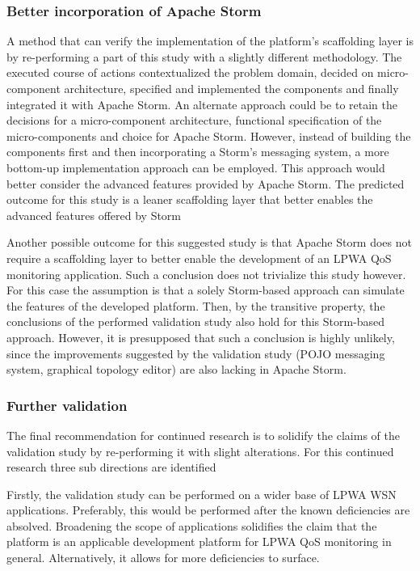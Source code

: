 \subsubsection{Better incorporation of Apache Storm}
A method that can verify the implementation of the  platform's scaffolding layer is by re-performing a part of this study with a slightly different methodology. The executed course of actions contextualized the problem domain, decided on micro-component architecture, specified and implemented the components and finally integrated it with Apache Storm. An alternate approach could be to retain the decisions for a micro-component architecture, functional specification of the micro-components and choice for Apache Storm. However, instead of building the components first and then incorporating a Storm's messaging system, a more bottom-up implementation approach can be employed. This approach would better consider the advanced features provided by Apache Storm. The predicted outcome for this study is a leaner scaffolding layer that better enables the advanced features offered by Storm

Another possible outcome for this suggested study is that Apache Storm does not require a scaffolding layer to better enable the development of an LPWA QoS monitoring application. Such a conclusion does not trivialize this study however. For this case the assumption is that a solely Storm-based approach can simulate the features of the developed platform. Then, by the transitive property, the conclusions of the performed validation study also hold for this Storm-based approach. However, it is presupposed that such a conclusion is highly unlikely, since the improvements suggested by the validation study (POJO messaging system, graphical topology editor) are also lacking in Apache Storm.

\subsubsection{Further validation}
The final recommendation for continued research is to solidify the claims of the validation study by re-performing it with slight alterations. For this continued research three sub directions are identified

Firstly, the validation study can be performed on a wider base of LPWA WSN applications. Preferably, this would be performed after the known deficiencies are absolved. Broadening the scope of applications solidifies the claim that the platform is an applicable development platform for LPWA QoS monitoring in general. Alternatively, it allows for more deficiencies to surface.

